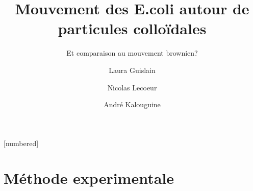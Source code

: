 \documentclass[11pt]{beamer}
\begin{document}
	\author{Laura Guislain \and Nicolas Lecoeur \and André Kalouguine}
	\title{Mouvement des E.coli autour de particules colloïdales}
	\subtitle{Et comparaison au mouvement brownien?}
	\subject{Characterization du mouvement bactérien et comparaison au mouvement brownien.}
	[numbered]
	
	\begin{frame}[plain]
	\maketitle
\end{frame}


\section{Méthode experimentale}
\end{document}
